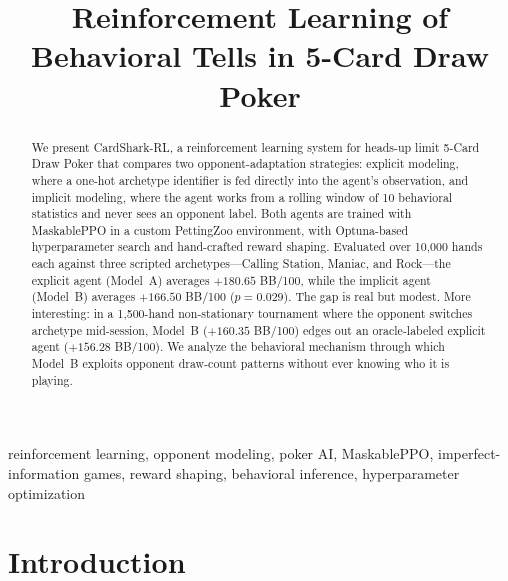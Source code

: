 \documentclass[11pt, conference]{IEEEtran}
\begin{document}
\title{Reinforcement Learning of Behavioral Tells in 5-Card Draw Poker}

\author{
}

\maketitle

\begin{abstract}
We present CardShark-RL, a reinforcement learning system for heads-up
limit 5-Card Draw Poker that compares two opponent-adaptation strategies:
explicit modeling, where a one-hot archetype identifier is fed directly
into the agent's observation, and implicit modeling, where the agent works
from a rolling window of 10 behavioral statistics and never sees an
opponent label. Both agents are trained with MaskablePPO
\cite{raffin2021stable} in a custom PettingZoo \cite{terry2021pettingzoo}
environment, with Optuna-based hyperparameter search \cite{akiba2019optuna}
and hand-crafted reward shaping. Evaluated over 10,000 hands each against
three scripted archetypes---Calling Station, Maniac, and Rock---the
explicit agent (Model~A) averages $+180.65$ BB/100, while the implicit
agent (Model~B) averages $+166.50$ BB/100 ($p = 0.029$). The gap is real
but modest. More interesting: in a 1,500-hand non-stationary tournament
where the opponent switches archetype mid-session, Model~B ($+160.35$
BB/100) edges out an oracle-labeled explicit agent ($+156.28$ BB/100).
We analyze the behavioral mechanism through which
Model~B exploits opponent draw-count patterns without ever knowing who
it is playing.
\end{abstract}

\begin{IEEEkeywords}
reinforcement learning, opponent modeling, poker AI, MaskablePPO,
imperfect-information games, reward shaping, behavioral inference,
hyperparameter optimization
\end{IEEEkeywords}

\section{Introduction}
\label{sec:intro}
\end{document}
